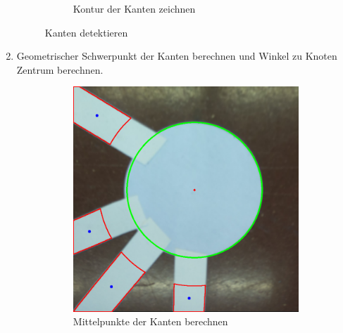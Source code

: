 \begin{enumerate}
\begin{figure}[H]
\begin{subfigure}{0.4\textwidth}
        \caption{Kontur der Kanten zeichnen}
        \label{fig:edge-contours}
        \end{subfigure}
        \caption{Kanten detektieren}
        \label{fig:detecting-edges}
        \end{figure}
    \item Geometrischer Schwerpunkt der Kanten berechnen und Winkel zu Knoten Zentrum berechnen.
        \begin{figure}[H]
        \centering
        \begin{subfigure}{0.4\textwidth}
        \includegraphics[width=0.95\linewidth]{assets/informatik-prototyp/opencv/angle_detection/edge_detect_centers.png} 
        \caption{Mittelpunkte der Kanten berechnen}
        \label{fig:edge-center}
        \end{subfigure}
        \begin{subfigure}{0.4\textwidth}

\end{subfigure}
\end{figure}
\end{enumerate}
